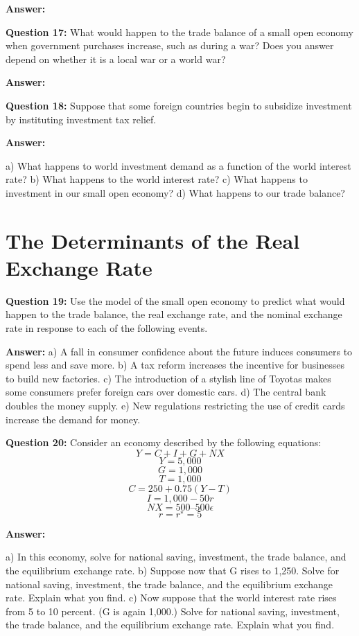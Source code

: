 \documentclass[a4paper, 11pt]{article}
\begin{document}
\textbf{Answer:} 


\textbf{Question 17:} What would happen to the trade balance of a small open economy when government purchases increase, such as during a war? Does you answer depend on whether it is a local war or a world war?

\textbf{Answer:} 


\textbf{Question 18:} Suppose that some foreign countries begin to subsidize investment by instituting investment tax relief.

\textbf{Answer:} 

a) What happens to world investment demand as a function of the world interest rate?
b) What happens to the world interest rate?
c) What happens to investment in our small open economy?
d) What happens to our trade balance?

\section{The Determinants of the Real Exchange Rate}

\textbf{Question 19:} Use the model of the small open economy to predict what would happen to the trade balance, the real exchange rate, and the nominal exchange rate in response to each of the following events.

\textbf{Answer:} 
a) A fall in consumer confidence about the future induces consumers to spend less and save more.
b) A tax reform increases the incentive for businesses to build new factories.
c) The introduction of a stylish line of Toyotas makes some consumers prefer foreign cars over domestic cars.
d) The central bank doubles the money supply.
e) New regulations restricting the use of credit cards increase the demand for money.

\textbf{Question 20:} Consider an economy described by the following equations:
$$Y = C + I + G + NX$$
$$Y = 5,000$$
$$G = 1,000$$
$$T = 1,000$$
$$C = 250 + 0.75(Y − T)$$
$$I = 1,000 − 50r$$
$$NX = 500 – 500\epsilon$$
$$r = r^{∗} = 5$$

\textbf{Answer:} 

a) In this economy, solve for national saving, investment, the trade balance, and the equilibrium exchange rate.
b) Suppose now that G rises to 1,250. Solve for national saving, investment, the trade balance, and the equilibrium exchange rate. Explain what you find.
c) Now suppose that the world interest rate rises from 5 to 10 percent. (G is again 1,000.) Solve for national saving, investment, the trade balance, and the equilibrium exchange rate. Explain what you find.
\end{document}
